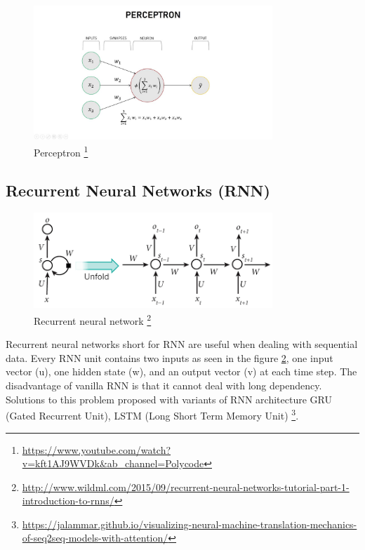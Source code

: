 \begin{figure}[t]
            \includegraphics[width=9cm]{thesis/figures/perceptronLearningAlgo.jpg}
            \centering
            \caption{Perceptron \footnote{\url{https://www.youtube.com/watch?v=kft1AJ9WVDk&ab_channel=Polycode}}}
            \label{fig:PLA}
\end{figure}
\subsection {Recurrent Neural Networks (RNN)}
\begin{figure}[]
            \includegraphics[width=9cm]{thesis/figures/RNN.png}
            \centering
            \caption{Recurrent neural network \footnote{\url{http://www.wildml.com/2015/09/recurrent-neural-networks-tutorial-part-1-introduction-to-rnns/}}}
            \label{fig:RNN}
\end{figure}
Recurrent neural networks short for RNN \cite{mikolov2010recurrent} are useful when dealing with sequential data. Every RNN unit contains two inputs as seen in the figure \ref{fig:RNN}, one input vector (u), one hidden state (w), and an output vector (v) at each time step. The disadvantage of vanilla RNN is that it cannot deal with long dependency. Solutions to this problem proposed with variants of RNN architecture GRU (Gated Recurrent Unit), LSTM (Long Short Term Memory Unit) \cite{mikolov2010recurrent}\footnote{\url{https://jalammar.github.io/visualizing-neural-machine-translation-mechanics-of-seq2seq-models-with-attention/}}.
